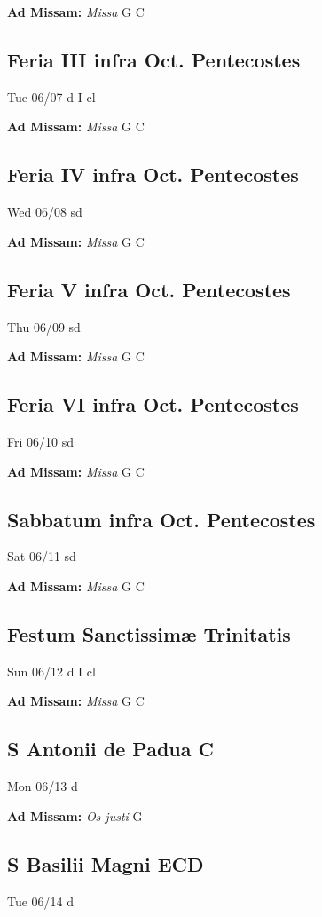 \documentclass[letterpaper, 10pt, twocolumn]{article}
\begin{document}
\textbf{Ad Missam:} \textit{Missa} G C 

\subsection*{Feria III infra Oct. Pentecostes}Tue 06/07 d I cl

\textbf{Ad Missam:} \textit{Missa} G C 

\subsection*{Feria IV infra Oct. Pentecostes}Wed 06/08 sd

\textbf{Ad Missam:} \textit{Missa} G C 

\subsection*{Feria V infra Oct. Pentecostes}Thu 06/09 sd

\textbf{Ad Missam:} \textit{Missa} G C 

\subsection*{Feria VI infra Oct. Pentecostes}Fri 06/10 sd

\textbf{Ad Missam:} \textit{Missa} G C 

\subsection*{Sabbatum infra Oct. Pentecostes}Sat 06/11 sd

\textbf{Ad Missam:} \textit{Missa} G C 

\subsection*{Festum Sanctissimæ Trinitatis}Sun 06/12 d I cl

\textbf{Ad Missam:} \textit{Missa} G C 

\subsection*{S Antonii de Padua C}Mon 06/13 d

\textbf{Ad Missam:} \textit{Os justi} G 

\subsection*{S Basilii Magni ECD}Tue 06/14 d
\end{document}
